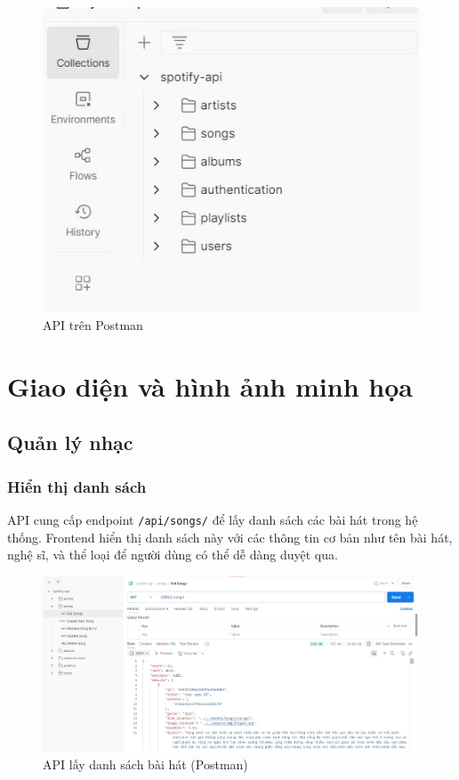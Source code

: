 \begin{itemize}
\begin{figure}[h]
    \centering
    \includegraphics[width=1\textwidth]{latex/imgs/api-postman.jpg}
    \caption{API trên Postman}
\end{figure}
\end{itemize}

\section{Giao diện và hình ảnh minh họa}

\subsection{Quản lý nhạc}

\subsubsection{Hiển thị danh sách}
API cung cấp endpoint \texttt{/api/songs/} để lấy danh sách các bài hát trong hệ thống. Frontend hiển thị danh sách này với các thông tin cơ bản như tên bài hát, nghệ sĩ, và thể loại để người dùng có thể dễ dàng duyệt qua.

\begin{figure}[H]
    \centering
    \includegraphics[width=1\textwidth]{latex/imgs/api-songs.jpg}
    \caption{API lấy danh sách bài hát (Postman)}
\end{figure}


